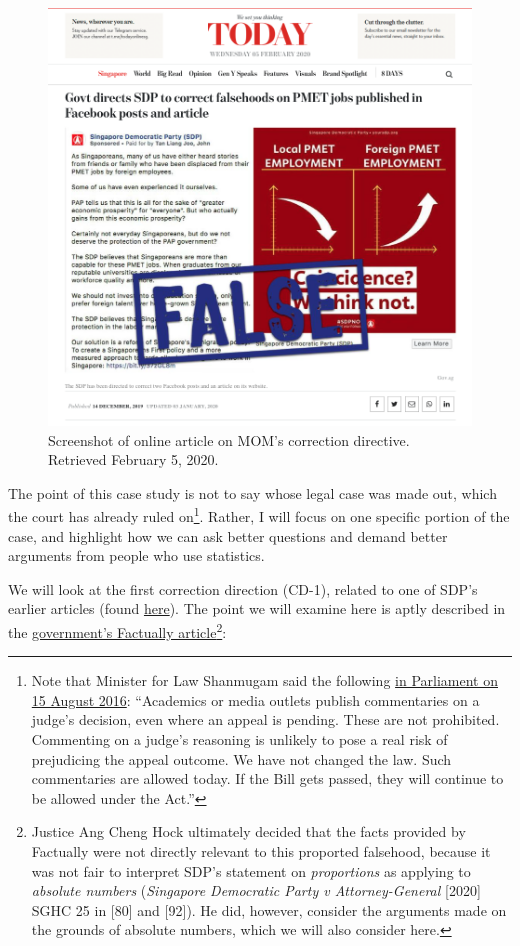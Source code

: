 \documentclass[openany]{book}
\let\rmarkdownfootnote\footnote%
\def\footnote{\protect\rmarkdownfootnote}
\begin{document}
\begin{figure}

{\centering \includegraphics[width=0.8\linewidth]{images/yousayisay/news1} 

}

\caption{Screenshot of online article on MOM's correction directive. Retrieved February 5, 2020.}\label{fig:today-sdp}
\end{figure}

The point of this case study is not to say whose legal case was made
out, which the court has already ruled on\footnote{Note that Minister
  for Law Shanmugam said the following
  \href{https://sprs.parl.gov.sg/search/fullreport?sittingdate=15-08-2016}{in
  Parliament on 15 August 2016}: ``Academics or media outlets publish
  commentaries on a judge's decision, even where an appeal is pending.
  These are not prohibited. Commenting on a judge's reasoning is
  unlikely to pose a real risk of prejudicing the appeal outcome. We
  have not changed the law. Such commentaries are allowed today. If the
  Bill gets passed, they will continue to be allowed under the Act.''}.
Rather, I will focus on one specific portion of the case, and highlight
how we can ask better questions and demand better arguments from people
who use statistics.

We will look at the first correction direction (CD-1), related to one of
SDP's earlier articles (found
\href{https://yoursdp.org/news/sdp_population_policy_hire_s_39_poreans_first_retrench_s_39_poreans_last}{here}).
The point we will examine here is aptly described in the
\href{https://www.gov.sg/article/factually-corrections-on-falsehoods-posted-by-sdp}{government's
Factually article}\footnote{Justice Ang Cheng Hock ultimately decided
  that the facts provided by Factually were not directly relevant to
  this proported falsehood, because it was not fair to interpret SDP's
  statement on \emph{proportions} as applying to \emph{absolute numbers}
  (\emph{Singapore Democratic Party v Attorney-General} {[}2020{]} SGHC
  25 in {[}80{]} and {[}92{]}). He did, however, consider the arguments
  made on the grounds of absolute numbers, which we will also consider
  here.}:
\end{document}

